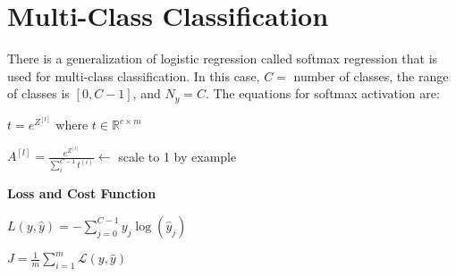 \section{Multi-Class Classification}

There is a generalization of logistic regression called softmax regression that is used for multi-class classification. In this case, $C =$ number of classes, the range of classes is $[0, C-1]$, and $N_y = C$. The equations for softmax activation are:

$t = e^{Z^{[l]}}$ where $t \in \mathbb{R}^{c \times m}$

$A^{[l]} = \frac{e^{Z^{[l]}}}{\sum_i^{C-1}t^{(i)}} \leftarrow$ scale to 1 by example

\textbf{Loss and Cost Function}

$L(y, \hat{y}) = - \sum_{j=0}^{C-1} y_j \log(\hat{y}_j)$

$J = \frac{1}{m} \sum_{i=1}^m \mathcal{L}(y, \hat{y})$